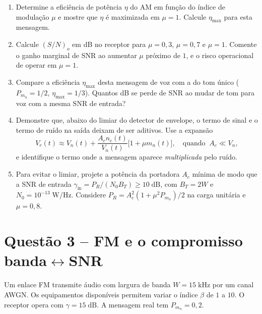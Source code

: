 \documentclass[11pt,a4paper]{article}
\begin{document}
\begin{enumerate}[label=\alph*)]
  \item Determine a eficiência de potência $\eta$ do AM em função do índice de modulação $\mu$ e mostre que $\eta$ é maximizada em $\mu = 1$. Calcule $\eta_{\max}$ para esta mensagem.
  \item Calcule $(S/N)_o$ em dB no receptor para $\mu = 0{,}3$, $\mu = 0{,}7$ e $\mu = 1$. Comente o ganho marginal de SNR ao aumentar $\mu$ próximo de $1$, e o risco operacional de operar em $\mu = 1$.
  \item Compare a eficiência $\eta_{\max}$ desta mensagem de voz com a do tom único ($P_{m_n} = 1/2$, $\eta_{\max} = 1/3$). Quantos dB se perde de SNR ao mudar de tom para voz com a mesma SNR de entrada?
  \item Demonstre que, abaixo do limiar do detector de envelope, o termo de sinal e o termo de ruído na saída deixam de ser aditivos. Use a expansão
  \[
    V_r(t) \approx V_n(t) + \frac{A_c n_c(t)}{V_n(t)}\bigl[1 + \mu m_n(t)\bigr], \quad \text{quando}\;\;A_c \ll V_n,
  \]
  e identifique o termo onde a mensagem aparece \emph{multiplicada} pelo ruído.
  \item Para evitar o limiar, projete a potência da portadora $A_c$ mínima de modo que a SNR de entrada $\gamma_{\text{in}} = P_R/(N_0 B_T) \ge 10\;\text{dB}$, com $B_T = 2W$ e $N_0 = 10^{-13}\;\text{W/Hz}$. Considere $P_R = A_c^2(1 + \mu^2 P_{m_n})/2$ na carga unitária e $\mu = 0{,}8$.
\end{enumerate}

\section*{Questão 3 -- FM e o compromisso banda$\leftrightarrow$SNR}

Um enlace FM transmite áudio com largura de banda $W = 15\;\text{kHz}$ por um canal AWGN. Os equipamentos disponíveis permitem variar o índice $\beta$ de $1$ a $10$. O receptor opera com $\gamma = 15\;\text{dB}$. A mensagem real tem $P_{m_n} = 0{,}2$.
\end{document}
